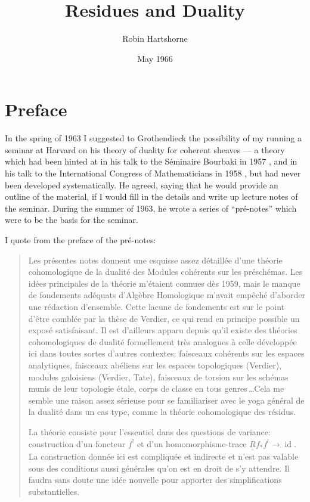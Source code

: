 \documentclass[12pt]{book}
\newcommand{\doubleunderline}[1]{\underline{\underline{#1}}}
\begin{document}
\frontmatter
\title{Residues and Duality}
\author{Robin Hartshorne}
\date{May 1966}
\maketitle
\frontmatter
\chapter*{Preface}

In the spring of 1963 I suggested to Grothendieck the possibility of my running a seminar at Harvard on his theory of duality for coherent sheaves --- a theory which had been hinted at in his talk to the Séminaire Bourbaki in 1957 \cite{8}, and in his talk to the International Congress of Mathematicians in 1958 \cite{9}, but had never been developed systematically. He agreed, saying that he would provide an outline of the material, if I would fill in the details and write up lecture notes of the seminar. During the summer of 1963, he wrote a series of ``pré-notes'' \cite{10} which were to be the basis for the seminar.

I quote from the preface of the pré-notes:

\begin{quote}
Les présentes notes donnent une esquisse assez détaillée d'une théorie cohomologique de la dualité des Modules cohérents sur les préschémas. Les idées principales de la théorie m'étaient connues dès 1959, mais le manque de fondements adéquats d'Algèbre Homologique m'avait empêché d'aborder une rédaction d'ensemble. Cette lacune de fondements est sur le point d'être comblée par la thèse de Verdier, ce qui rend en principe possible un exposé satisfaisant. Il est d'ailleurs apparu depuis qu'il existe des théories cohomologiques de dualité formellement très analogues à celle développée ici dans toutes sortes d'autres contextes: faisceaux cohérents sur les espaces analytiques, faisceaux abéliens sur les espaces topologiques (Verdier), modules galoisiens (Verdier, Tate), faisceaux de torsion sur les schémas munis de leur topologie étale, corps de classe en tous genres\,\dots Cela me semble une raison assez sérieuse pour se familiariser avec le yoga général de la dualité dans un cas type, comme la théorie cohomologique des résidus.

La théorie consiste pour l'essentiel dans des questions de variance: construction d'un foncteur \(f^{!}\) et d'un homomorphisme-trace \(\doubleunderline{R}f_{*}f^{!}\to\operatorname{id}\). La construction donnée ici est compliquée et indirecte et n'est pas valable sous des conditions aussi générales qu'on est en droit de s'y attendre. Il faudra sans doute une idée nouvelle pour apporter des simplifications substantielles.
\end{quote}
\end{document}
